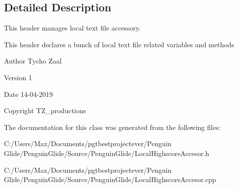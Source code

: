 \subsection{Detailed Description}
This header manages local text file accessory. 

This header declares a bunch of local text file related variables and methods \begin{DoxyAuthor}{Author}
Tycho Zaal 
\end{DoxyAuthor}
\begin{DoxyVersion}{Version}
1 
\end{DoxyVersion}
\begin{DoxyDate}{Date}
14-\/04-\/2019 
\end{DoxyDate}
\begin{DoxyCopyright}{Copyright}
T\+Z\+\_\+productions 
\end{DoxyCopyright}


The documentation for this class was generated from the following files\+:\begin{DoxyCompactItemize}
\item 
C\+:/\+Users/\+Max/\+Documents/pgtbestprojectever/\+Penguin Glide/\+Penguin\+Glide/\+Source/\+Penguin\+Glide/Local\+Highscore\+Accesor.\+h\item 
C\+:/\+Users/\+Max/\+Documents/pgtbestprojectever/\+Penguin Glide/\+Penguin\+Glide/\+Source/\+Penguin\+Glide/Local\+Highscore\+Accesor.\+cpp\end{DoxyCompactItemize}
